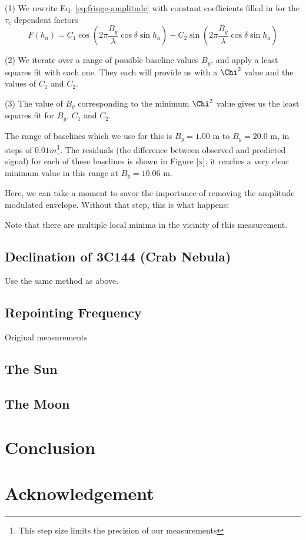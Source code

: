 \documentclass[12pt]{article}
\begin{document}
(1) We rewrite Eq. \ref{eq:fringe-amplitude} with constant coefficients filled in for the $\tau_c$ dependent factors
\begin{equation}
F(h_a) = C_1 \cos{\left( 2\pi \frac{B_y}{\lambda} 
\cos{\delta} \sin{h_a} \right)} - C_2 \sin{\left( 2\pi \frac{B_y}{\lambda} 
\cos{\delta} \sin{h_a} \right)} \label{eq:fringe-amplitude}
\end{equation}

(2) We iterate over a range of possible baseline values $B_y$, and apply a least squares fit with each one. They each will provide us with a $\Chi^2$ value and the values of $C_1$ and $C_2$.

(3) The value of $B_y$ corresponding to the minimum $\Chi^2$ value gives us the least squares fit for $B_y$, $C_1$ and $C_2$.

The range of baselines which we use for this is $B_y=1.00$ m to $B_y = 20.0$ m, in steps of $0.01 m$\footnote{This step size limits the precision of our measurements}. The residuals (the difference between observed and predicted signal) for each of these baselines is shown in Figure [x]; it reaches a very clear minimum value in this range at $B_y = 10.06$ m.

Here, we can take a moment to savor the importance of removing the amplitude modulated envelope. Without that step, this is what happens: 

Note that there are multiple local minima in the vicinity of this measurement. 

\subsection{Declination of 3C144 (Crab Nebula)}
Use the same method as above.

\subsection{Repointing Frequency}
Original measurements

\subsection{The Sun}
\subsection{The Moon}


\section{Conclusion}


\section{Acknowledgement}
\end{document}
